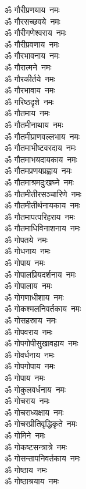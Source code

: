 \begin{multicols}{2}
\begin{flushleft}
ॐ गौरीप्रणयाय~नमः\hfill{}\\
ॐ गौरसच्छवये~नमः\\
ॐ गौरीगणेश्वराय~नमः\\
ॐ गौरीप्रवणाय~नमः\\
ॐ गौरभावनाय~नमः\\
ॐ गौरात्मने~नमः\\
ॐ गौरकीर्तये~नमः\\
ॐ गौरभावाय~नमः\\
ॐ गरिष्ठदृशे~नमः\\
ॐ गौतमाय~नमः\\
ॐ गौतमीनाथाय~नमः\hfill{}\\
ॐ गौतमीप्राणवल्लभाय~नमः\\
ॐ गौतमाभीष्टवरदाय~नमः\\
ॐ गौतमाभयदायकाय~नमः\\
ॐ गौतमप्रणयप्रह्वाय~नमः\\
ॐ गौतमाश्रमदुःखघ्ने~नमः\\
ॐ गौतमीतीरसञ्चारिणे~नमः\\
ॐ गौतमीतीर्थनायकाय~नमः\\
ॐ गौतमापत्परिहराय~नमः\\
ॐ गौतमाधिविनाशनाय~नमः\\
ॐ गोपतये~नमः\hfill{}\\
ॐ गोधनाय~नमः\\
ॐ गोपाय~नमः\\
ॐ गोपालप्रियदर्शनाय~नमः\\
ॐ गोपालाय~नमः\\
ॐ गोगणाधीशाय~नमः\\
ॐ गोकश्मलनिवर्तकाय~नमः\\
ॐ गोसहस्राय~नमः\\
ॐ गोपवराय~नमः\\
ॐ गोपगोपीसुखावहाय~नमः\\
ॐ गोवर्धनाय~नमः\hfill{}\\
ॐ गोपगोपाय~नमः\\
ॐ गोपाय~नमः\\
ॐ गोकुलवर्धनाय~नमः\\
ॐ गोचराय~नमः\\
ॐ गोचराध्यक्षाय~नमः\\
ॐ गोचरप्रीतिवृद्धिकृते~नमः\\
ॐ गोमिने~नमः\\
ॐ गोकष्टसन्त्रात्रे~नमः\\
ॐ गोसन्तापनिवर्तकाय~नमः\\
ॐ गोष्ठाय~नमः\hfill{}\\
ॐ गोष्ठाश्रयाय~नमः\\

\end{flushleft}
\end{multicols}
